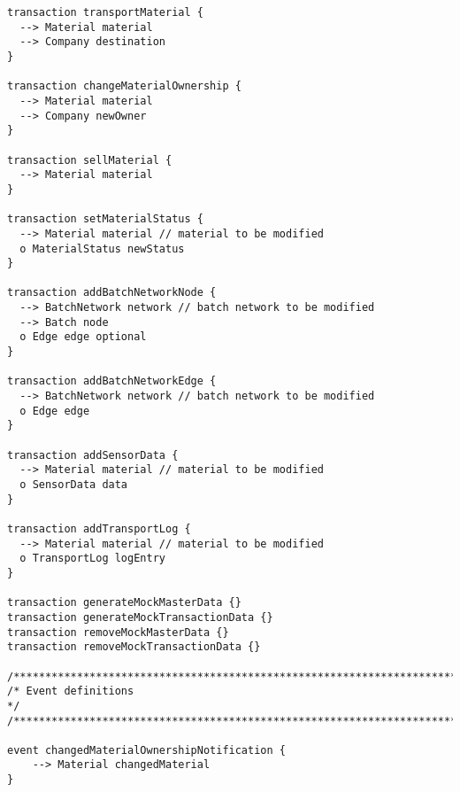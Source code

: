 \begin{lstlisting}[]
transaction transportMaterial {
  --> Material material
  --> Company destination
}

transaction changeMaterialOwnership {
  --> Material material
  --> Company newOwner
}

transaction sellMaterial {
  --> Material material
}

transaction setMaterialStatus {
  --> Material material // material to be modified
  o MaterialStatus newStatus
}

transaction addBatchNetworkNode {
  --> BatchNetwork network // batch network to be modified
  --> Batch node
  o Edge edge optional
}

transaction addBatchNetworkEdge {
  --> BatchNetwork network // batch network to be modified
  o Edge edge
}

transaction addSensorData {
  --> Material material // material to be modified
  o SensorData data
}

transaction addTransportLog {
  --> Material material // material to be modified
  o TransportLog logEntry
}

transaction generateMockMasterData {}
transaction generateMockTransactionData {}
transaction removeMockMasterData {}
transaction removeMockTransactionData {}

/*****************************************************************************/
/* Event definitions                                                         */
/*****************************************************************************/

event changedMaterialOwnershipNotification {
    --> Material changedMaterial
}
\end{lstlisting}

\newpage
